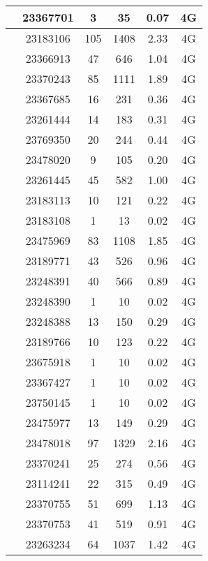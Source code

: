 \begin{longtable*}{|c|c|c|c|c|c|}
 &23367701&3&35&0.07&4G\\\hline
{} &23183106&105&1408&2.33&4G\\\hline
{} &23366913&47&646&1.04&4G\\\hline
{} &23370243&85&1111&1.89&4G\\\hline
{} &23367685&16&231&0.36&4G\\\hline
{} &23261444&14&183&0.31&4G\\\hline
{} &23769350&20&244&0.44&4G\\\hline
{} &23478020&9&105&0.20&4G\\\hline
{} &23261445&45&582&1.00&4G\\\hline
{} &23183113&10&121&0.22&4G\\\hline
{} &23183108&1&13&0.02&4G\\\hline
{} &23475969&83&1108&1.85&4G\\\hline
{} &23189771&43&526&0.96&4G\\\hline
{} &23248391&40&566&0.89&4G\\\hline
{} &23248390&1&10&0.02&4G\\\hline
{} &23248388&13&150&0.29&4G\\\hline
{} &23189766&10&123&0.22&4G\\\hline
{} &23675918&1&10&0.02&4G\\\hline
{} &23367427&1&10&0.02&4G\\\hline
{} &23750145&1&10&0.02&4G\\\hline
{} &23475977&13&149&0.29&4G\\\hline
{} &23478018&97&1329&2.16&4G\\\hline
{} &23370241&25&274&0.56&4G\\\hline
{} &23114241&22&315&0.49&4G\\\hline
{} &23370755&51&699&1.13&4G\\\hline
{} &23370753&41&519&0.91&4G\\\hline
{} &23263234&64&1037&1.42&4G\\\hline

\end{longtable*}
